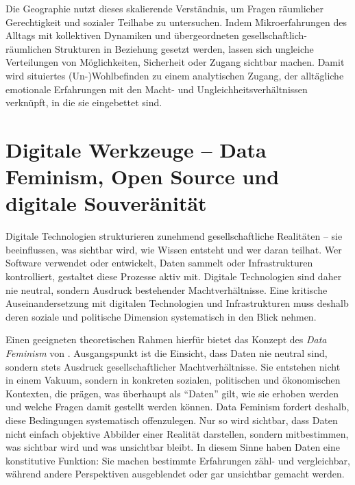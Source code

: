 Die Geographie nutzt dieses skalierende Verständnis, um Fragen räumlicher Gerechtigkeit und sozialer Teilhabe zu untersuchen. Indem Mikroerfahrungen des Alltags mit kollektiven Dynamiken und übergeordneten gesellschaftlich-räumlichen Strukturen in Beziehung gesetzt werden, lassen sich ungleiche Verteilungen von Möglichkeiten, Sicherheit oder Zugang sichtbar machen. Damit wird situiertes (Un-)Wohlbefinden zu einem analytischen Zugang, der alltägliche emotionale Erfahrungen mit den Macht- und Ungleichheitsverhältnissen verknüpft, in die sie eingebettet sind.

\section{Digitale Werkzeuge -- Data Feminism, Open Source und digitale Souveränität}
\label{sec:datafeminism}

Digitale Technologien strukturieren zunehmend gesellschaftliche Realitäten -- sie beeinflussen, was sichtbar wird, wie Wissen entsteht und wer daran teilhat. Wer Software verwendet oder entwickelt, Daten sammelt oder Infrastrukturen kontrolliert, gestaltet diese Prozesse aktiv mit. Digitale Technologien sind daher nie neutral, sondern Ausdruck bestehender Machtverhältnisse. Eine kritische Auseinandersetzung mit digitalen Technologien und Infrastrukturen muss deshalb deren soziale und politische Dimension systematisch in den Blick nehmen.

Einen geeigneten theoretischen Rahmen hierfür bietet das Konzept des \textit{Data Feminism} von \textcite{dignazioDataFeminism2020}. Ausgangspunkt ist die Einsicht, dass Daten nie neutral sind, sondern stets Ausdruck gesellschaftlicher Machtverhältnisse. Sie entstehen nicht in einem Vakuum, sondern in konkreten sozialen, politischen und ökonomischen Kontexten, die prägen, was überhaupt als \enquote{Daten} gilt, wie sie erhoben werden und welche Fragen damit gestellt werden können. Data Feminism fordert deshalb, diese Bedingungen systematisch offenzulegen. Nur so wird sichtbar, dass Daten nicht einfach objektive Abbilder einer Realität darstellen, sondern mitbestimmen, was sichtbar wird und was unsichtbar bleibt. In diesem Sinne haben Daten eine konstitutive Funktion: Sie machen bestimmte Erfahrungen zähl- und vergleichbar, während andere Perspektiven ausgeblendet oder gar unsichtbar gemacht werden.

